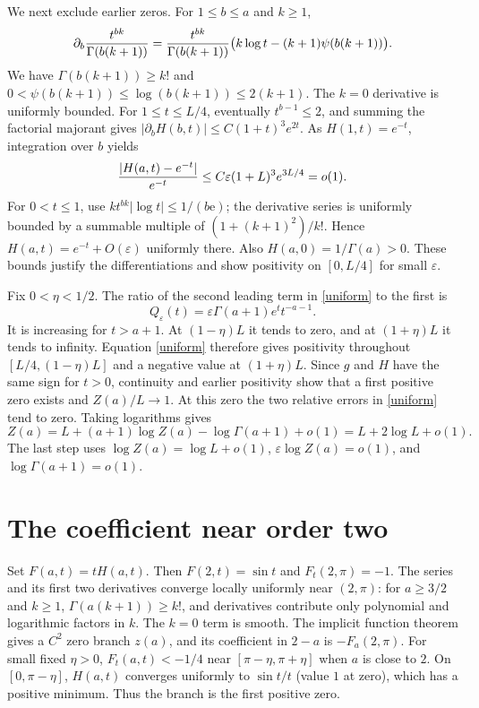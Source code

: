 \documentclass[11pt]{article}
\begin{document}
We next exclude earlier zeros. For $1\leq b\leq a$ and $k\geq1$,
\[
 \partial_b {t^{bk}\over\Gamma(b(k+1))}
 ={t^{bk}\over\Gamma(b(k+1))}
        \bigl(k\log t-(k+1)\psi(b(k+1))\bigr).
\]
We have $\Gamma(b(k+1))\geq k!$ and
$0<\psi(b(k+1))\leq\log(b(k+1))\leq2(k+1)$.
The $k=0$ derivative is uniformly bounded. For $1\leq t\leq L/4$,
eventually $t^{b-1}\leq2$, and summing the factorial majorant gives
$|\partial_b H(b,t)|\leq C(1+t)^3e^{2t}$.
As $H(1,t)=e^{-t}$, integration over $b$ yields
\[
 { |H(a,t)-e^{-t}|\over e^{-t}}
 \leq C\varepsilon(1+L)^3e^{3L/4}=o(1).
\]
For $0<t\leq1$, use $k t^{bk}|\log t|\leq1/(b\mathrm e)$;
the derivative series is uniformly bounded by a summable multiple
of $(1+(k+1)^2)/k!$. Hence $H(a,t)=e^{-t}+O(\varepsilon)$
uniformly there. Also $H(a,0)=1/\Gamma(a)>0$.
These bounds justify the differentiations and show positivity on
$[0,L/4]$ for small $\varepsilon$.

Fix $0<\eta<1/2$. The ratio of the second leading term in
\eqref{uniform} to the first is
\[
 Q_\varepsilon(t)=\varepsilon\Gamma(a+1)e^t t^{-a-1}.
\]
It is increasing for $t>a+1$. At $(1-\eta)L$ it tends to zero,
and at $(1+\eta)L$ it tends to infinity. Equation \eqref{uniform}
therefore gives positivity throughout $[L/4,(1-\eta)L]$ and a
negative value at $(1+\eta)L$. Since $g$ and $H$ have the same
sign for $t>0$, continuity and earlier positivity show that a first
positive zero exists and $Z(a)/L\to1$.
At this zero the two relative errors in \eqref{uniform} tend to zero.
Taking logarithms gives
\[
 Z(a)=L+(a+1)\log Z(a)-\log\Gamma(a+1)+o(1)
      =L+2\log L+o(1).
\]
The last step uses $\log Z(a)=\log L+o(1)$,
$\varepsilon\log Z(a)=o(1)$, and $\log\Gamma(a+1)=o(1)$.

\section*{The coefficient near order two}
Set $F(a,t)=tH(a,t)$. Then $F(2,t)=\sin t$ and
$F_t(2,\pi)=-1$. The series and its first two derivatives converge
locally uniformly near $(2,\pi)$: for $a\geq3/2$ and $k\geq1$,
$\Gamma(a(k+1))\geq k!$, and derivatives contribute only
polynomial and logarithmic factors in $k$. The $k=0$ term is smooth.
The implicit function theorem gives a $C^2$ zero branch $z(a)$,
and its coefficient in $2-a$ is $-F_a(2,\pi)$.
For small fixed $\eta>0$, $F_t(a,t)<-1/4$ near
$[\pi-\eta,\pi+\eta]$ when $a$ is close to $2$.
On $[0,\pi-\eta]$, $H(a,t)$ converges uniformly to
$\sin t/t$ (value $1$ at zero), which has a positive minimum.
Thus the branch is the first positive zero.
\end{document}
